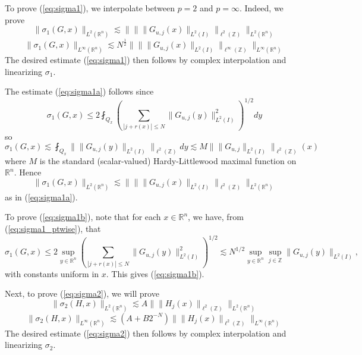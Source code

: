 \documentclass[12pt,leqno]{amsart}
\def\R{\mathbb{R}}
\def\Z{\mathbb{Z}}
\theoremstyle{plain}
\numberwithin{equation}{section}
\begin{document}
To prove (\ref{eq:sigma1}), we interpolate between $p=2$ and $p=\infty$. Indeed, we prove
\begin{equation} \label{eq:sigma1a}
\|\sigma_1(G,x)\|_{L^2(\R^n)} \lesssim \| \| \| G_{u,j}(x) \|_{L^2(I)} \|_{\ell^2(\Z)} \|_{L^2(\R^n)}
\end{equation}
\begin{equation} \label{eq:sigma1b}
\|\sigma_1(G,x)\|_{L^{\infty}(\R^n)} \lesssim N^{\frac{1}{2}} \| \| \| G_{u,j}(x) \|_{L^2(I)} \|_{\ell^{\infty}(\Z)} \|_{L^{\infty}(\R^n)}
\end{equation}
The desired estimate (\ref{eq:sigma1}) then follows by complex interpolation and linearizing $\sigma_1$.

The estimate (\ref{eq:sigma1a}) follows since
\begin{equation} \label{eq:sigma1_ptwise}
\sigma_1(G,x) \leq 2 \fint_{Q_x} \left( \sum_{|j +r(x)| \leq N} \|G_{u,j}(y) \|_{L^2(I)}^2 \right)^{1/2} dy
\end{equation}
so
\[
\sigma_1(G,x) \lesssim \fint_{Q_x} \| \|G_{u,j}(y) \|_{L^2(I)} \|_{\ell^2(\Z)} dy  \lesssim M \| \|G_{u,j} \|_{L^2(I)} \|_{\ell^2(\Z)} (x)
\]
where $M$ is the standard (scalar-valued) Hardy-Littlewood maximal function on $\R^n$. Hence 
\[
\|\sigma_1(G,x) \|_{L^2(\R^n)} \lesssim \| \| \|G_{u,j}(x) \|_{L^2(I)} \|_{\ell^2(\Z)} \|_{L^2(\R^n)}
\]
as in (\ref{eq:sigma1a}).

To prove (\ref{eq:sigma1b}), note that for each $x \in \R^n$, we have, from (\ref{eq:sigma1_ptwise}), that
\[
\sigma_1(G,x) \leq 2 \sup_{y \in \R^n} \left( \sum_{|j +r(x)| \leq N} \|G_{u,j}(y) \|_{L^2(I)}^2 \right)^{1/2} 
\lesssim N^{1/2} \sup_{y \in \R^n} \sup_{j \in \Z} \|G_{u,j}(y)\|_{L^2(I)},
\]
with constants uniform in $x$. This gives (\ref{eq:sigma1b}).

Next, to prove (\ref{eq:sigma2}), we will prove
\begin{equation} \label{eq:sigma2a}
\|\sigma_2(H,x)\|_{L^2(\R^n)} \lesssim A \| \|H_j(x)\|_{\ell^2(\Z)} \|_{L^2(\R^n)}
\end{equation} 
\begin{equation} \label{eq:sigma2b}
\|\sigma_2(H,x)\|_{L^{\infty}(\R^n)} \lesssim (A+B 2^{-N}) \| \|H_j(x)\|_{\ell^2(\Z)} \|_{L^{\infty}(\R^n)}
\end{equation} 
The desired estimate (\ref{eq:sigma2}) then follows by complex interpolation and linearizing $\sigma_2$.
\end{document}
